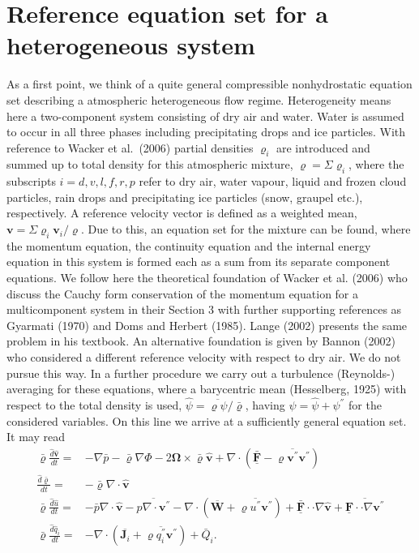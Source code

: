 \section{Reference equation set for a heterogeneous system}
As a first point, we think of a quite general compressible nonhydrostatic equation set describing a atmospheric  heterogeneous flow regime. Heterogeneity means here a two-component system consisting of dry air and water. Water is assumed to occur in all three phases including precipitating drops and ice particles. With reference to Wacker et al.~(2006) partial densities $\varrho_i$ are introduced and summed up to total density for this atmospheric mixture, $\varrho=\Sigma \varrho_i$, where the subscripts $i=d, v, l, f, r, p$ refer to dry air, water vapour, liquid and frozen cloud particles, rain drops and precipitating ice particles (snow, graupel etc.), respectively. A reference velocity vector is defined as a weighted mean, $\mathbf{v}= \Sigma \varrho_i \mathbf{v}_i / \varrho $. Due to this, an equation set for the mixture can be found, where the momentum equation, the continuity equation and the internal energy equation in this system is formed each as a sum from its separate component equations. We follow here the theoretical foundation of Wacker et al. (2006) who discuss the Cauchy form conservation of the momentum equation for a multicomponent system in their Section 3 with further supporting references as Gyarmati (1970) and Doms and Herbert (1985). Lange (2002) presents the same problem in his textbook. An alternative foundation is given by Bannon (2002) who considered a different reference velocity with respect to dry air. We do not pursue this way.
In a further procedure we carry out a turbulence (Reynolds-) averaging for these equations, where a barycentric mean (Hesselberg, 1925) with respect to the total density is used, $\hat{\psi}={\overline{\varrho \psi }}/{\bar{\varrho}}$, having $\psi = \hat{\psi}+ \psi^{''}$ for the considered variables. On this line we arrive at a sufficiently general equation set. It may read
\begin{align}
\bar{\varrho}\frac{\hat{d}\hat{\mathbf{v}}}{dt}
=&-\nabla\bar{p}-\bar{\varrho}\nabla\Phi
-2 \mathbf{\Omega}\times \bar{\varrho}\hat{\mathbf{v}}
+\nabla\cdot(\bar{\underline{\mathbf{F}}} - \overline{\varrho \mathbf{v}^{''}\mathbf{v}^{''}})\label{equ1}\\
\frac{\hat{d}\bar{\varrho}}{dt}
=& - \bar{\varrho}\nabla\cdot \hat{\mathbf{v}}\label{equ2}\\
\bar{\varrho}\frac{\hat{d}\hat{u}}{dt}
=&- \bar{p}\nabla\cdot \hat{\mathbf{v}} - \overline{p \nabla\cdot {\mathbf{v}}^{''}}
- \nabla\cdot( \overline{\mathbf{W}}+\overline{\varrho u^{''}\mathbf{v}^{''}})
+\bar{\underline{\mathbf{F}}}\cdot\cdot \nabla \hat{\mathbf{v}}
+\overline{\underline{\mathbf{F}}\cdot\cdot\nabla \mathbf{v}^{''}}\label{equ3}\\
\bar{\varrho}\frac{\hat{d}\hat{q}_{i}}{dt}
=&- \nabla\cdot( \overline{\mathbf{J}_{i}} + \overline{\varrho q_{i}^{''}\mathbf{v}^{''}}) + \bar{Q}_i .\label{equ4}
\end{align}
